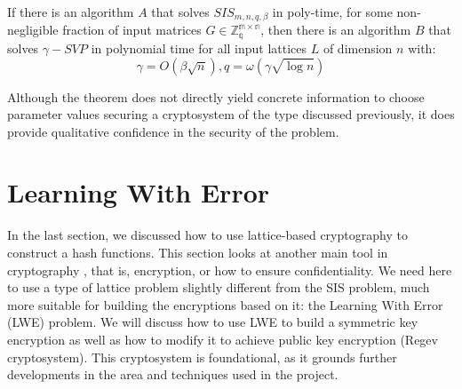 \begin{theorem}
   If there is an algorithm $A$ that solves
  $SIS_{m,n,q,\beta}$ in poly-time, for some non-negligible fraction of input
  matrices $G \in \mathbb{Z_q^{m \times n}}$, then there is an algorithm $B$
  that solves $\gamma-SVP$ in polynomial time for all input lattices $L$ of
  dimension $n$ with:
  \[
    \gamma = O(\beta\sqrt{n}), q = \omega(\gamma\sqrt{\log n})
  \]
  \label{theo:AjtaiHardness}
\end{theorem}

Although the theorem does not directly yield concrete information to choose
parameter values securing a cryptosystem of the type discussed previously, it does provide qualitative confidence in the security of the problem.

\section{Learning With Error}
\label{sub:LWE}
In the last section, we discussed how to use lattice-based cryptography to
construct a hash functions. This section looks at another main tool in
cryptography , that is, encryption, or how to ensure confidentiality. We need here to
use a type of lattice problem slightly different from the SIS problem, much more suitable for building the encryptions based on it: the Learning With Error (LWE) problem. We will discuss how to use LWE to build a symmetric key encryption as well as how to modify it to achieve public key encryption (Regev cryptosystem). This cryptosystem is foundational, as it grounds further developments in the area and techniques used in the project.

